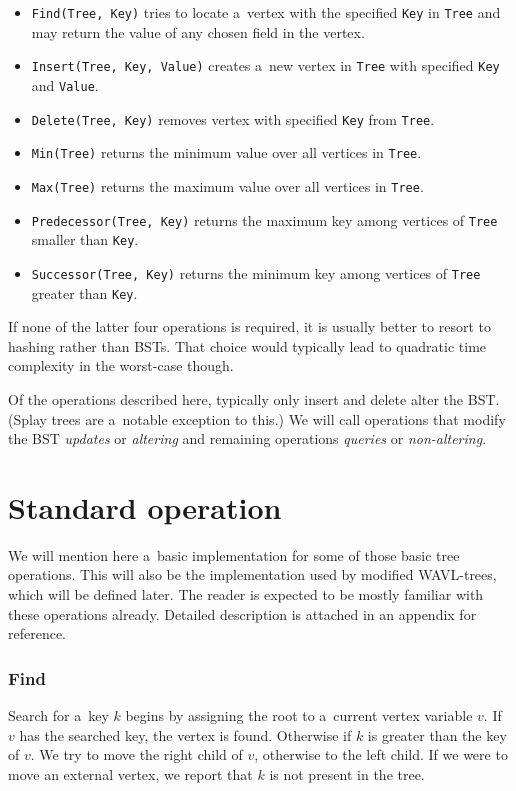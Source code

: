 \begin{itemize}
	\item \texttt{Find(Tree, Key)} tries to locate a~vertex with the specified \texttt{Key} in \texttt{Tree} and may return the value of any chosen field in the vertex.
	\item \texttt{Insert(Tree, Key, Value)} creates a~new vertex in \texttt{Tree} with specified \texttt{Key} and \texttt{Value}.
	\item \texttt{Delete(Tree, Key)} removes vertex with specified \texttt{Key} from \texttt{Tree}.
	\item \texttt{Min(Tree)} returns the minimum value over all vertices in \texttt{Tree}.
	\item \texttt{Max(Tree)} returns the maximum value over all vertices in \texttt{Tree}.
	\item \texttt{Predecessor(Tree, Key)} returns the maximum key among vertices of \texttt{Tree} smaller than \texttt{Key}.
	\item \texttt{Successor(Tree, Key)} returns the minimum key among vertices of \texttt{Tree} greater than \texttt{Key}.
\end{itemize}

If none of the latter four operations is required, it is usually better to resort to hashing rather than BSTs. That choice would typically lead to quadratic time complexity in the worst-case though.

Of the operations described here, typically only insert and delete alter the BST. (Splay trees \cite{splay} are a~notable exception to this.) We will call operations that modify the BST {\em updates} or {\em altering} and remaining operations {\em queries} or {\em non-altering}.

\section{Standard operation}

We will mention here a~basic implementation for some of those basic tree operations. This will also be the implementation used by modified WAVL-trees, which will be defined later. The reader is expected to be mostly familiar with these operations already. Detailed description is attached in an appendix for reference.

\subsubsection*{Find}
Search for a~key $k$ begins by assigning the root to a~current vertex variable $v$. If $v$ has the searched key, the vertex is found. Otherwise if $k$ is greater than the key of $v$. We try to move the right child of $v$, otherwise to the left child. If we were to move an external vertex, we report that $k$ is not present in the tree.


